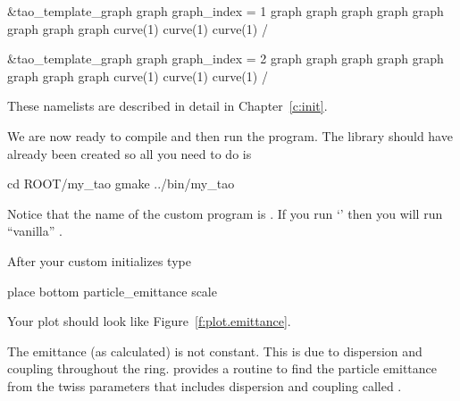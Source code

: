 {{\begin{example}
  &tao_template_graph
    graph%
    graph_index = 1
    graph%
    graph%
    graph%
    graph%
    graph%
    graph%
    graph%
    graph%
    curve(1)%
    curve(1)%
    curve(1)%
  /

  &tao_template_graph
    graph%
    graph_index = 2
    graph%
    graph%
    graph%
    graph%
    graph%
    graph%
    graph%
    graph%
    curve(1)%
    curve(1)%
    curve(1)%
  /
\end{example}
These namelists are described in detail in Chapter~\ref{c:init}.

We are now ready to compile and then run the program. The \tao library
should have already been created so all you need to do is
\begin{example}
  cd ROOT/my_tao
  gmake
  ../bin/my_tao
\end{example}
Notice that the name of the custom \tao program is . If you run 
`' then you will run ``vanilla'' \tao.

After your custom \tao initializes type
\begin{example}
  place bottom particle_emittance
  scale
\end{example}
Your plot should look like Figure~\ref{f:plot.emittance}.

The emittance (as calculated) is not constant. This is due to
dispersion and coupling throughout the ring. \bmad provides a routine
to find the particle emittance from the twiss parameters that includes
dispersion and coupling called .

}}
